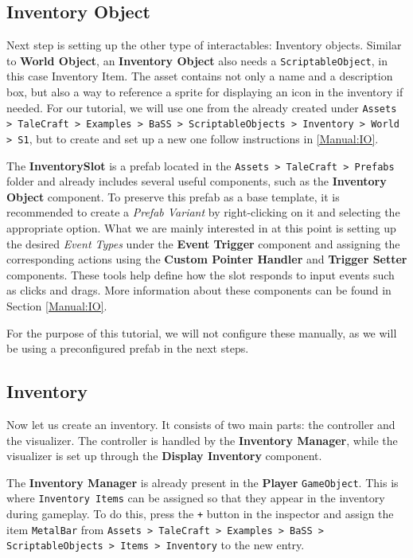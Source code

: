 \subsection{Inventory Object} 
Next step is setting up the other type of interactables: Inventory objects. Similar to \textbf{World Object}, an \textbf{Inventory Object} also needs a \verb|ScriptableObject|, in this case Inventory Item. The asset contains not only a name and a description box, but also a way to reference a sprite for displaying an icon in the inventory if needed. For our tutorial, we will use one from the already created under \texttt{Assets > TaleCraft > Examples > BaSS > ScriptableObjects > Inventory > World > S1}, but to create and set up a new one follow instructions in \ref{Manual:IO}.


The \textbf{InventorySlot} is a prefab located in the \texttt{Assets > TaleCraft > Prefabs} folder and already includes several useful components, such as the \textbf{Inventory Object} component. To preserve this prefab as a base template, it is recommended to create a \textit{Prefab Variant} by right-clicking on it and selecting the appropriate option. What we are mainly interested in at this point is setting up the desired \textit{Event Types} under the \textbf{Event Trigger} component and assigning the corresponding actions using the \textbf{Custom Pointer Handler} and \textbf{Trigger Setter} components. These tools help define how the slot responds to input events such as clicks and drags. More information about these components can be found in Section \ref{Manual:IO}.

For the purpose of this tutorial, we will not configure these manually, as we will be using a preconfigured prefab in the next steps.


\subsection{Inventory}
Now let us create an inventory. It consists of two main parts: the controller and the visualizer. The controller is handled by the \textbf{Inventory Manager}, while the visualizer is set up through the \textbf{Display Inventory} component.

The \textbf{Inventory Manager} is already present in the \textbf{Player} \verb|GameObject|. This is where \texttt{Inventory Items} can be assigned so that they appear in the inventory during gameplay. To do this, press the \texttt{+} button in the inspector and assign the item \verb|MetalBar| from \texttt{Assets > TaleCraft > Examples > BaSS > ScriptableObjects > Items > Inventory} to the new entry.

